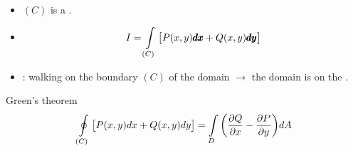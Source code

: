 \begin{multicols}{4}
\colbreak

      \begin{itemize}
        \item $(C)$ is a .
        \item {}
          \begin{equation*}
            I = \int \limits_{(C)} \big[P(x, y)\pmb{dx} + Q(x, y)\pmb{dy}\big]
          \end{equation*}
        \item {}: walking on the boundary $(C)$ of the domain
          $\to$ the domain is on the .
      \end{itemize}
      \par Green's theorem
        \begin{equation}
          \oint \limits_{(C)} \big[P(x, y)dx + Q(x, y)dy\big]
          = \int \limits_{D} \bigg( \frac{\partial Q}{\partial x} - \frac{\partial P}{\partial y} \bigg)dA
        \end{equation}


\end{multicols}